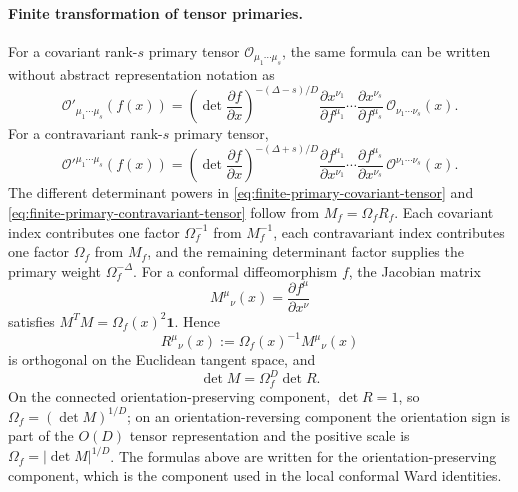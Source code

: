 \paragraph{Finite transformation of tensor primaries.}
For a covariant rank-\(s\) primary tensor
\(\mathcal O_{\mu_1\cdots\mu_s}\), the same formula can be written without
abstract representation notation as
\begin{equation}
  \mathcal O'_{\mu_1\cdots\mu_s}(f(x))
  =
  \left(\det\frac{\partial f}{\partial x}\right)^{-(\Delta-s)/D}
  \frac{\partial x^{\nu_1}}{\partial f^{\mu_1}}\cdots
  \frac{\partial x^{\nu_s}}{\partial f^{\mu_s}}\,
  \mathcal O_{\nu_1\cdots\nu_s}(x).
  \label{eq:finite-primary-covariant-tensor}
\end{equation}
For a contravariant rank-\(s\) primary tensor,
\begin{equation}
  \mathcal O'^{\mu_1\cdots\mu_s}(f(x))
  =
  \left(\det\frac{\partial f}{\partial x}\right)^{-(\Delta+s)/D}
  \frac{\partial f^{\mu_1}}{\partial x^{\nu_1}}\cdots
  \frac{\partial f^{\mu_s}}{\partial x^{\nu_s}}\,
  \mathcal O^{\nu_1\cdots\nu_s}(x).
  \label{eq:finite-primary-contravariant-tensor}
\end{equation}
The different determinant powers in
\eqref{eq:finite-primary-covariant-tensor} and
\eqref{eq:finite-primary-contravariant-tensor} follow from
\(M_f=\Omega_f R_f\).  Each covariant index contributes one factor
\(\Omega_f^{-1}\) from \(M_f^{-1}\), each contravariant index contributes one
factor \(\Omega_f\) from \(M_f\), and the remaining determinant factor supplies
the primary weight \(\Omega_f^{-\Delta}\).
For a conformal diffeomorphism \(f\), the Jacobian matrix
\[
  M^\mu{}_\nu(x)=\frac{\partial f^\mu}{\partial x^\nu}
\]
satisfies \(M^T M=\Omega_f(x)^2\mathbf 1\).  Hence
\[
  R^\mu{}_\nu(x):=\Omega_f(x)^{-1}M^\mu{}_\nu(x)
\]
is orthogonal on the Euclidean tangent space, and
\[
  \det M=\Omega_f^D\det R.
\]
On the connected orientation-preserving component, \(\det R=1\), so
\(\Omega_f=(\det M)^{1/D}\); on an orientation-reversing component the
orientation sign is part of the \(O(D)\) tensor representation and the
positive scale is \(\Omega_f=|\det M|^{1/D}\).  The formulas above are written
for the orientation-preserving component, which is the component used in the
local conformal Ward identities.

